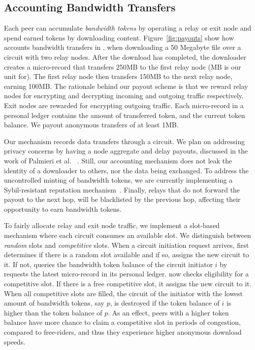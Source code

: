 \subsection{Accounting Bandwidth Transfers}
Each peer can accumulate \emph{bandwidth tokens} by operating a relay or exit node and spend earned tokens by downloading content.
Figure~\ref{fig:payouts} show how \ModelName{} accounts bandwidth transfers in \Tribler{}, when downloading a 50 Megabyte file over a circuit with two relay nodes.
After the download has completed, the downloader creates a micro-record that transfers 250MB to the first relay node (MB is our unit for).
The first relay node then transfers 150MB to the next relay node, earning 100MB.
The rationale behind our payout scheme is that we reward relay nodes for encrypting and decrypting incoming and outgoing traffic respectively.
Exit nodes are rewarded for encrypting outgoing traffic.
Each micro-record in a personal ledger contains the amount of transferred token, and the current token balance.
We payout anonymous transfers of at least 1MB.

Our mechanism records data transfers through a circuit.
We plan on addressing privacy concerns by having a node aggregate and delay payouts, discussed in the work of Palmieri et al. ~\cite{palmieri2015paying}.
Still, our accounting mechanism does not leak the identity of a downloader to others, nor the data being exchanged.
To address the uncontrolled minting of bandwidth tokens, we are currently implementing a Sybil-resistant reputation mechanism~\cite{otte2017trustchain}.
Finally, relays that do not forward the payout to the next hop, will be blacklisted by the previous hop, affecting their opportunity to earn bandwidth tokens.

To fairly allocate relay and exit node traffic, we implement a slot-based mechanism where each circuit consumes an available slot.
We distinguish between \emph{random} slots and \emph{competitive} slots.
When a circuit initiation request arrives, \Tribler{} first determines if there is a random slot available and if so, assigns the new circuit to it.
If not, \Tribler{} queries the bandwidth token balance of the circuit initiator $ i $ by requests the latest micro-record in its personal ledger.
\Tribler{} now checks eligibility for a competitive slot.
If there is a free competitive slot, it assigns the new circuit to it.
When all competitive slots are filled, the circuit of the initiator with the lowest amount of bandwidth tokens, say $ p $, is destroyed if the token balance of $ i $ is higher than the token balance of $ p $.
As an effect, peers with a higher token balance have more chance to claim a competitive slot in periods of congestion, compared to free-riders, and thus they experience higher anonymous download speeds.

